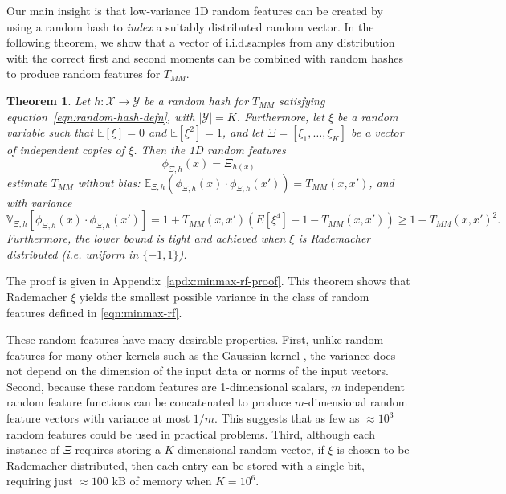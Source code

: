 \documentclass{article}
\theoremstyle{plain}
\newtheorem{theorem}{Theorem}[section]
\theoremstyle{definition}
\theoremstyle{remark}
\newcommand{\E}{\mathbb{E}}
\begin{document}
Our main insight is that low-variance 1D random features can be created
by using a random hash to \emph{index} a suitably distributed random vector.
In the following theorem, we show that a vector of i.i.d.\@ samples
from any distribution with the correct first and second moments
can be combined with random hashes to produce random features for $T_{MM}$.
\begin{theorem}\label{thm:general-minmax-rf}
    Let $h:\mathcal X \to \mathcal Y$ be a random hash for $T_{MM}$ satisfying equation~\ref{eqn:random-hash-defn}, with $|\mathcal Y|=K$. Furthermore, let $\xi$ be a random variable such that $\mathbb{E}[\xi]=0$ and $\mathbb{E}[\xi^2]=1$,
    and let $\Xi=[\xi_1,\ldots,\xi_K]$ be a vector of independent copies of $\xi$.
    Then the 1D random features 
    \begin{equation}\label{eqn:minmax-rf}
        \phi_{\Xi,h}(x)=\Xi_{h(x)}  
    \end{equation}
    estimate $T_{MM}$ without bias: 
    $\E_{\Xi,h}(\phi_{\Xi,h}(x)\cdot\phi_{\Xi,h}(x')) = T_{MM}(x,x')$,
    and with variance
    \begin{equation}\label{eqn:general-minmax-rf-variance}
    \mathbb{V}_{\Xi,h}\left[\phi_{\Xi,h}(x)\cdot \phi_{\Xi,h}(x')\right] = 1+T_{MM}(x,x')\left(E[\xi^4]-1-T_{MM}(x,x')\right) \ge 1-T_{MM}(x,x')^2.
    \end{equation}
    Furthermore, the lower bound is tight and achieved when $\xi$ is Rademacher distributed (i.e. uniform in $\{-1,1\}$).
\end{theorem}

The proof is given in Appendix~\ref{apdx:minmax-rf-proof}. This theorem shows that Rademacher $\xi$ yields the smallest possible variance in the class of random features defined in \cref{eqn:minmax-rf}.

These random features have many desirable properties. First, unlike random features for many other kernels such as the Gaussian kernel \citep{liu2021random},
the variance does not depend on the dimension of the input data or norms of the input vectors.
Second, because these random features are 1-dimensional scalars,
$m$ independent random feature functions can be concatenated to produce $m$-dimensional random feature
vectors with variance at most $1/m$.
This suggests that as few as $\approx10^3$ random features could be used in practical problems.
Third, although each instance of $\Xi$ requires storing a $K$ dimensional random vector,
if $\xi$ is chosen to be Rademacher distributed, then each entry can be stored with a single bit,
requiring just $\approx 100$ kB of memory when $K=10^6$.
\end{document}

